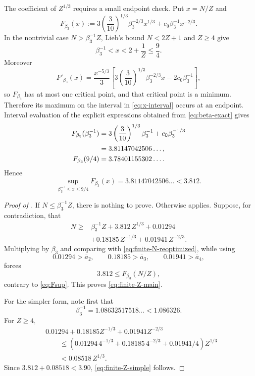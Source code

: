 The coefficient of $Z^{1/3}$ requires a small endpoint check.  Put $x=N/Z$ and
\[
 F_{\beta_3}(x):=
 3\left(\frac3{10}\right)^{1/3}\beta_3^{-2/3}x^{1/3}
 +c_0\beta_3^{-1}x^{-2/3}.
\]
In the nontrivial case $N>\beta_3^{-1}Z$, Lieb's bound $N<2Z+1$ and $Z\ge4$ give
\begin{equation}\label{eq:x-interval}
 \beta_3^{-1}<x<2+\frac1Z\le\frac94.
\end{equation}
Moreover
\[
 F'_{\beta_3}(x)
 =
 \frac{x^{-5/3}}{3}
 \left[
 3\left(\frac3{10}\right)^{1/3}\beta_3^{-2/3}x
 -2c_0\beta_3^{-1}
 \right],
\]
so $F_{\beta_3}$ has at most one critical point, and that critical point is a minimum.  Therefore its maximum on the interval in \eqref{eq:x-interval} occurs at an endpoint.  Interval evaluation of the explicit expressions obtained from \eqref{eq:beta-exact} gives
\begin{align*}
 F_{\beta_3}(\beta_3^{-1})
 &=
 3\left(\frac3{10}\right)^{1/3}\beta_3^{-1}
 +c_0\beta_3^{-1/3}
 \notag\\
 &=3.81147042506\ldots,\\
 F_{\beta_3}(9/4)&=3.78401155302\ldots.
\end{align*}
Hence
\begin{equation}\label{eq:Fsup}
 \sup_{\beta_3^{-1}\le x\le9/4}F_{\beta_3}(x)
 =3.81147042506\ldots<3.812.
\end{equation}

\begin{proof}[Proof of ]
If $N\le\beta_3^{-1}Z$, there is nothing to prove.  Otherwise  applies.  Suppose, for contradiction, that
\begin{align*}
N\ge{}&
 \beta_3^{-1}Z+3.812\,Z^{1/3}+0.01294\\
&+0.18185\,Z^{-1/3}+0.01941\,Z^{-2/3}.
\end{align*}
Multiplying by $\beta_3$ and comparing with \eqref{eq:finite-N-reoptimized}, while using
\[
 0.01294>\bar a_2,\qquad
 0.18185>\bar a_3,\qquad
 0.01941>\bar a_4,
\]
forces
\[
 3.812\le F_{\beta_3}(N/Z),
\]
contrary to \eqref{eq:Fsup}.  This proves \eqref{eq:finite-Z-main}.

For the simpler form, note first that
\[
 \beta_3^{-1}=1.08632517518\ldots<1.086326.
\]
For $Z\ge4$,
\begin{align*}
&0.01294+0.18185Z^{-1/3}+0.01941Z^{-2/3}\\
&\qquad\le
 \left(
 0.01294\,4^{-1/3}
 +0.18185\,4^{-2/3}
 +0.01941/4
 \right)Z^{1/3}\\
&\qquad<
 0.08518\,Z^{1/3}.
\end{align*}
Since $3.812+0.08518<3.90$, \eqref{eq:finite-Z-simple} follows.
\end{proof}

